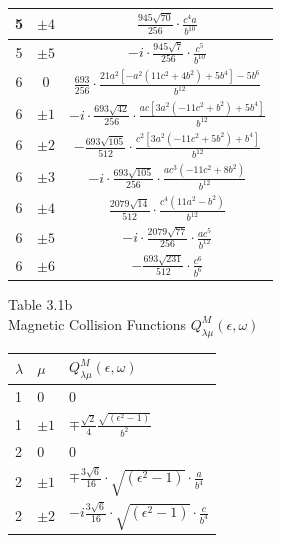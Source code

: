 \documentclass[10pt]{article}
\begin{document}
\begin{center}
\begin{tabular}{|c|c|c|}
\hline
5 & $\pm 4$ & \( \frac{945 \sqrt{70}}{256} \cdot \frac{c^{4} a}{b^{10}} \) \\
\hline
5 & $\pm 5$ & \( -i \cdot \frac{945 \sqrt{7}}{256} \cdot \frac{c^{5}}{b^{10}} \) \\
\hline
6 & 0 & \( \frac{693}{256} \cdot \frac{21 a^{2}\left[-a^{2}\left(11 c^{2}+4 b^{2}\right)+5 b^{4}\right]-5 b^{6}}{b^{12}} \) \\
\hline
6 & $\pm 1$ & \( -i \cdot \frac{693 \sqrt{42}}{256} \cdot \frac{a c\left[3 a^{2}\left(-11 c^{2}+b^{2}\right)+5 b^{4}\right]}{b^{12}} \) \\
\hline
6 & $\pm 2$ & \( -\frac{693 \sqrt{105}}{512} \cdot \frac{c^{2}\left[3 a^{2}\left(-11 c^{2}+5 b^{2}\right)+b^{4}\right]}{b^{12}} \) \\
\hline
6 & $\pm 3$ & \( -i \cdot \frac{693 \sqrt{105}}{256} \cdot \frac{a c^{3}\left(-11 c^{2}+8 b^{2}\right)}{b^{12}} \) \\
\hline
6 & $\pm 4$ & \( \frac{2079 \sqrt{14}}{512} \cdot \frac{c^{4}\left(11 a^{2}-b^{2}\right)}{b^{12}} \) \\
\hline
6 & $\pm 5$ & \( -i \cdot \frac{2079 \sqrt{77}}{256} \cdot \frac{a c^{5}}{b^{12}} \) \\
\hline
6 & $\pm 6$ & \( -\frac{693 \sqrt{231}}{512} \cdot \frac{c^{6}}{b^{6}} \) \\
\hline
\end{tabular}
\end{center}

Table 3.1b\\
Magnetic Collision Functions $Q_{\lambda \mu}^{M}(\epsilon, \omega)$

\begin{center}
\begin{tabular}{|l|l|l|}
\hline
$\lambda$ & $\mu$ & $Q_{\lambda \mu}^{M}(\epsilon, \omega)$ \\
\hline
1 & 0 & 0 \\
\hline
1 & $\pm 1$ & $\mp \frac{\sqrt{2}}{4} \frac{\sqrt{\left(\epsilon^{2}-1\right)}}{b^{2}}$ \\
\hline
2 & 0 & 0 \\
\hline
2 & $\pm 1$ & $\mp \frac{3 \sqrt{6}}{16} \cdot \sqrt{\left(\epsilon^{2}-1\right)} \cdot \frac{a}{b^{4}}$ \\
\hline
2 & $\pm 2$ & $-i \frac{3 \sqrt{6}}{16} \cdot \sqrt{\left(\epsilon^{2}-1\right)} \cdot \frac{c}{b^{4}}$ \\
\hline
\end{tabular}
\end{center}
\end{document}

